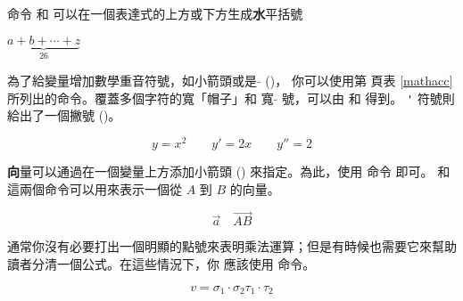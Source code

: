 命令  和  可以在一個表達式的上方或下方生成{\textbf
水平括號}
\begin{example}
$\underbrace{a+b+\cdots+z}_{26}$
\end{example}


為了給變量增加數學重音符號，如小箭頭或是 $\tilde{}$ ()，
你可以使用第 \pageref{mathacc} 頁表 \ref{mathacc} 所列出的命令。覆蓋多個字符的寬「帽子」和
寬 $\tilde{}$ 號，可以由  和  得到。
 \verb|'| 符號則給出了一個撇號 ()。

\begin{example}
\begin{displaymath}
y=x^{2}\qquad y'=2x\qquad y''=2
\end{displaymath}
\end{example}


{\textbf
向量}可以通過在一個變量上方添加小箭頭 () 來指定。為此，使用  命令
即可。 和  這兩個命令可以用來表示一個從 $A$ 到 $B$ 的向量。

\begin{example}
\begin{displaymath}
\vec a\quad\overrightarrow{AB}
\end{displaymath}
\end{example}


通常你沒有必要打出一個明顯的點號來表明乘法運算；但是有時候也需要它來幫助讀者分清一個公式。在這些情況下，你
應該使用  命令。
\begin{example}
\begin{displaymath}
v = {\sigma}_1 \cdot {\sigma}_2
    {\tau}_1 \cdot {\tau}_2
\end{displaymath}
\end{example}


